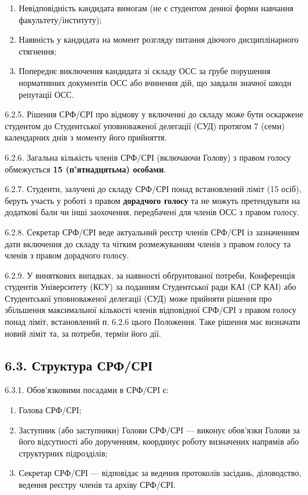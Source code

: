         \begin{enumerate}[label=\alph*)]
            \item Невідповідність кандидата вимогам (не є студентом денної форми навчання факультету/інституту);
            \item Наявність у кандидата на момент розгляду питання діючого дисциплінарного стягнення;
            \item Попереднє виключення кандидата зі складу ОСС за грубе порушення нормативних документів ОСС або вчинення дій, що завдали значної шкоди репутації ОСС.
        \end{enumerate}

    6.2.5. Рішення СРФ/СРІ про відмову у включенні до складу може бути оскаржене студентом до Студентської уповноваженої делегації (СУД) протягом 7 (семи) календарних днів з моменту його прийняття.

    6.2.6. Загальна кількість членів СРФ/СРІ (включаючи Голову) з правом голосу обмежується \textbf{15 (п'ятнадцятьма) особами}.

    6.2.7. Студенти, залучені до складу СРФ/СРІ понад встановлений ліміт (15 осіб), беруть участь у роботі з правом \textbf{дорадчого голосу} та не можуть претендувати на додаткові бали чи інші заохочення, передбачені для членів ОСС з правом голосу.

    6.2.8. Секретар СРФ/СРІ веде актуальний реєстр членів СРФ/СРІ із зазначенням дати включення до складу та чітким розмежуванням членів з правом голосу та членів з правом дорадчого голосу.

    6.2.9. У виняткових випадках, за наявності обґрунтованої потреби, Конференція студентів Університету (КСУ) за поданням Студентської ради КАІ (СР КАІ) або Студентської уповноваженої делегації (СУД) може прийняти рішення про збільшення максимальної кількості членів відповідної СРФ/СРІ з правом голосу понад ліміт, встановлений п. 6.2.6 цього Положення. Таке рішення має визначати новий ліміт та, за потреби, термін його дії.

\subsection*{6.3. Структура СРФ/СРІ}
    6.3.1. Обов'язковими посадами в СРФ/СРІ є:

        \begin{enumerate}[label=\alph*)]
            \item Голова СРФ/СРІ;
            \item Заступник (або заступники) Голови СРФ/СРІ — виконує обов'язки Голови за його відсутності або дорученням, координує роботу визначених напрямів або структурних підрозділів;
            \item Секретар СРФ/СРІ — відповідає за ведення протоколів засідань, діловодство, ведення реєстру членів та архіву СРФ/СРІ.
        \end{enumerate}

